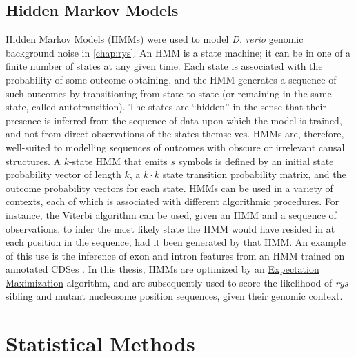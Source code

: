 \subsection{Hidden Markov Models}
\label{ssec:HMM}
Hidden Markov Models (HMMs) were used to model \textit{D. rerio} genomic background noise in \autoref{chap:rys}. An HMM is a state machine; it can be in one of a finite number of states at any given time. Each state is associated with the probability of some outcome obtaining, and the HMM generates a sequence of such outcomes by transitioning from state to state (or remaining in the same state, called autotransition). The states are ``hidden'' in the sense that their presence is inferred from the sequence of data upon which the model is trained, and not from direct observations of the states themselves. HMMs are, therefore, well-suited to modelling sequences of outcomes with obscure or irrelevant causal structures. A $k$-state HMM that emits $s$ symbols is defined by an initial state probability vector of length $k$, a $k\cdot k$ state transition probability matrix, and the outcome probability vectors for each state. HMMs can be used in a variety of contexts, each of which is associated with different algorithmic procedures. For instance, the Viterbi algorithm can be used, given an HMM and a sequence of observations, to infer the most likely state the HMM would have resided in at each position in the sequence, had it been generated by that HMM. An example of this use is the inference of exon and intron features from an HMM trained on annotated CDSes \cite{Henderson1997}. In this thesis, HMMs are optimized by an \hyperref[ssec:EM]{Expectation Maximization} algorithm, and are subsequently used to score the likelihood of \textit{rys} sibling and mutant nucleosome position sequences, given their genomic context.


\section{Statistical Methods}


